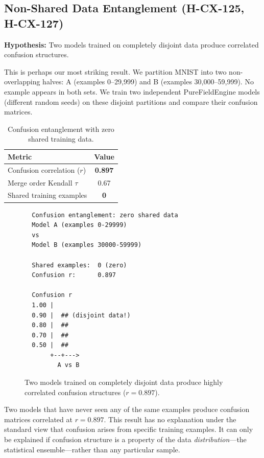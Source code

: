 \documentclass[11pt,a4paper]{article}
\begin{document}
\subsection{Non-Shared Data Entanglement (H-CX-125, H-CX-127)}

\textbf{Hypothesis:} Two models trained on completely disjoint data produce correlated confusion structures.

This is perhaps our most striking result. We partition MNIST into two non-overlapping halves: A (examples 0--29,999) and B (examples 30,000--59,999). No example appears in both sets. We train two independent PureFieldEngine models (different random seeds) on these disjoint partitions and compare their confusion matrices.

\begin{table}[htbp]
\centering
\caption{Confusion entanglement with zero shared training data.}
\label{tab:entanglement}
\begin{tabular}{lc}
\toprule
Metric & Value \\
\midrule
Confusion correlation ($r$) & \textbf{0.897} \\
Merge order Kendall $\tau$  & 0.67 \\
Shared training examples    & \textbf{0} \\
\bottomrule
\end{tabular}
\end{table}

\begin{figure}[htbp]
\centering
\begin{verbatim}
  Confusion entanglement: zero shared data
  Model A (examples 0-29999)
  vs
  Model B (examples 30000-59999)

  Shared examples:  0 (zero)
  Confusion r:      0.897

  Confusion r
  1.00 |
  0.90 |  ## (disjoint data!)
  0.80 |  ##
  0.70 |  ##
  0.50 |  ##
       +--+--->
         A vs B
\end{verbatim}
\caption{Two models trained on completely disjoint data produce highly correlated confusion structures ($r = 0.897$).}
\label{fig:entanglement}
\end{figure}

Two models that have never seen any of the same examples produce confusion matrices correlated at $r = 0.897$. This result has no explanation under the standard view that confusion arises from specific training examples. It can only be explained if confusion structure is a property of the data \emph{distribution}---the statistical ensemble---rather than any particular sample.
\end{document}

